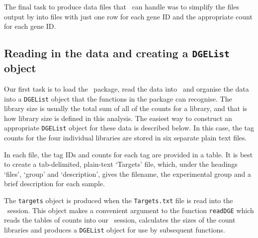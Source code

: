 The final task to produce data files that \edgeR\ can handle was to
simplify the files output by  into files with
just one row for each gene ID and the appropriate count for each gene
ID.

\subsection{Reading in the data and creating a \texttt{DGEList} object}

Our first task is to load the \edgeR\ package, read the data into \R\
and organise the data into a \texttt{DGEList} object that the
functions in the package can recognise. The library size is usually
the total sum of all of the counts for a library, and that is how
library size is defined in this analysis. The easiest way to construct
an appropriate \texttt{DGEList} object for these data is described
below. In this case, the tag counts for the four individual libraries
are stored in six separate plain text files.

In each file, the tag IDs and counts for each tag are provided in a
table. It is best to create a tab-delimited, plain-text `Targets'
file, which, under the headings `files', `group' and `description',
gives the filename, the experimental group and a brief description for
each sample.

The \texttt{targets} object is produced when the \texttt{Targets.txt}
file is read into the \R\ session. This object makes a convenient
argument to the function \texttt{readDGE} which reads the tables of
counts into our \R\ session, calculates the sizes of the count
libraries and produces a \texttt{DGEList} object for use by subsequent
functions.


